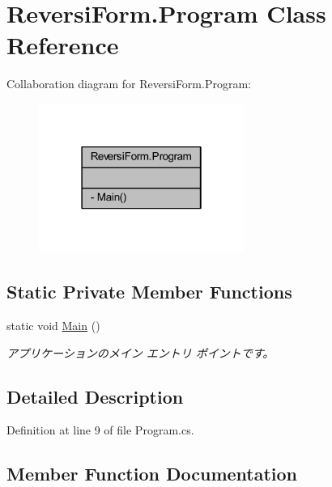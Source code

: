 \hypertarget{class_reversi_form_1_1_program}{}\section{Reversi\+Form.\+Program Class Reference}
\label{class_reversi_form_1_1_program}


Collaboration diagram for Reversi\+Form.\+Program\+:\nopagebreak
\begin{figure}[H]
\begin{center}
\leavevmode
\includegraphics[width=190pt]{class_reversi_form_1_1_program__coll__graph}
\end{center}
\end{figure}
\subsection*{Static Private Member Functions}
\begin{DoxyCompactItemize}
\item 
static void \hyperlink{class_reversi_form_1_1_program_a0d307c8bc3af65198f8bc1cef61e050f}{Main} ()
\begin{DoxyCompactList}\small\item\em アプリケーションのメイン エントリ ポイントです。 \end{DoxyCompactList}\end{DoxyCompactItemize}


\subsection{Detailed Description}


Definition at line 9 of file Program.\+cs.



\subsection{Member Function Documentation}
\mbox{\label{class_reversi_form_1_1_program_a0d307c8bc3af65198f8bc1cef61e050f}} 
